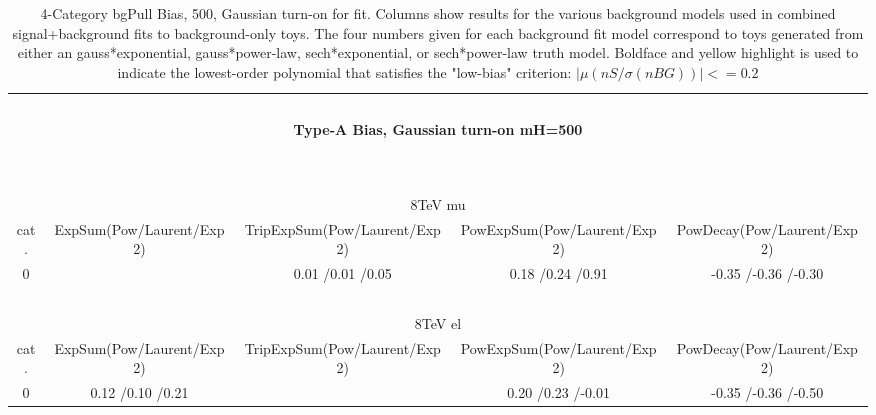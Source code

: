 \documentclass[11pt,final]{article}
\begin{document}
\begin{landscape}
\begin{table}[htb]
\begin{center}
 \label{tab:pull}
 \end{center}
\end{table}
\begin{table}[htb]
 \begin{center}
  \begin{tabular}{|c|c|c|c|c|}
  \multicolumn{5}{c}{~} \\ 
  \multicolumn{5}{c}{{\bf Type-A Bias, Gaussian turn-on mH=500}} \\ 
  \multicolumn{5}{c}{~} \\ 
  \multicolumn{5}{c}{~} \\ 
  \hline 
  \multicolumn{5}{|c|}{8TeV mu} \\ 
  \hline 
  cat. & ExpSum(Pow/Laurent/Exp2) & TripExpSum(Pow/Laurent/Exp2) & PowExpSum(Pow/Laurent/Exp2) & PowDecay(Pow/Laurent/Exp2) \\ 
  \hline 
  0 & \cellcolor{Yellow}{\bf 0.12 \slash 0.11 \slash 0.15} & 0.01 \slash 0.01 \slash 0.05 & 0.18 \slash 0.24 \slash 0.91 & -0.35 \slash -0.36 \slash -0.30 \\ 
  \hline 
  \multicolumn{5}{c}{~} \\ 
  \hline 
  \multicolumn{5}{|c|}{8TeV el} \\ 
  \hline 
  cat. & ExpSum(Pow/Laurent/Exp2) & TripExpSum(Pow/Laurent/Exp2) & PowExpSum(Pow/Laurent/Exp2) & PowDecay(Pow/Laurent/Exp2) \\ 
  \hline 
  0 & 0.12 \slash 0.10 \slash 0.21 & \cellcolor{Yellow}{\bf 0.07 \slash 0.10 \slash 0.16} & 0.20 \slash 0.23 \slash -0.01 & -0.35 \slash -0.36 \slash -0.50 \\ 
  \hline 
  \end{tabular}
 \caption{4-Category bgPull Bias, 500, Gaussian turn-on for fit.  Columns show results for the various background models used in combined signal+background fits to background-only toys.  The four numbers given for each background fit model correspond to toys generated from either an gauss*exponential, gauss*power-law, sech*exponential, or sech*power-law truth model.  Boldface and yellow highlight is used to indicate the lowest-order polynomial that satisfies the "low-bias" criterion: $|\mu(nS/\sigma(nBG))|<=0.2$  }
 \label{tab:pull}
 \end{center}
\end{table}
\end{landscape}
\end{document}
